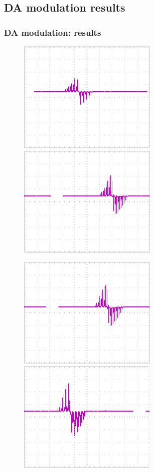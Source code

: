 \documentclass[12pt, aspectratio=169]{beamer}
\begin{document}
\subsection{DA modulation results}

\begin{frame}
  \frametitle{DA modulation: results}
  
\begin{figure}
\includegraphics[width=0.33\linewidth]{hebb_r_0_50K}
\includegraphics[width=0.33\linewidth]{hebb_r_25_25K}
\end{figure}
\begin{figure}
\includegraphics[width=0.33\linewidth]{hebb_r_37_5_12_5K}
\includegraphics[width=0.33\linewidth]{hebb_r_50_0K}
\end{figure}

\end{frame}

\end{document}
